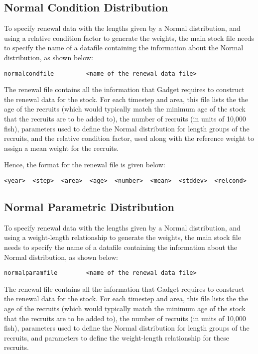 \documentclass[10pt,twoside]{book}
\begin{document}
\subsection{Normal Condition Distribution}
To specify renewal data with the lengths given by a Normal distribution, and using a relative condition factor to generate the weights, the main stock file needs to specify the name of a datafile containing the information about the Normal distribution, as shown below:

{\small\begin{verbatim}
normalcondfile         <name of the renewal data file>
\end{verbatim}}

The renewal file contains all the information that Gadget requires to construct the renewal data for the stock.  For each timestep and area, this file lists the the age of the recruits (which would typically match the minimum age of the stock that the recruits are to be added to), the number of recruits (in units of 10,000 fish), parameters used to define the Normal distribution for length groups of the recruits, and the relative condition factor, used along with the reference weight to assign a mean weight for the recruits.

\bigskip
Hence, the format for the renewal file is given below:

{\small\begin{verbatim}
<year>  <step>  <area>  <age>  <number>  <mean>  <stddev>  <relcond>
\end{verbatim}}

\subsection{Normal Parametric Distribution}
To specify renewal data with the lengths given by a Normal distribution, and using a weight-length relationship to generate the weights, the main stock file needs to specify the name of a datafile containing the information about the Normal distribution, as shown below:

{\small\begin{verbatim}
normalparamfile        <name of the renewal data file>
\end{verbatim}}

The renewal file contains all the information that Gadget requires to construct the renewal data for the stock.  For each timestep and area, this file lists the the age of the recruits (which would typically match the minimum age of the stock that the recruits are to be added to), the number of recruits (in units of 10,000 fish), parameters used to define the Normal distribution for length groups of the recruits, and parameters to define the weight-length relationship for these recruits.
\end{document}
